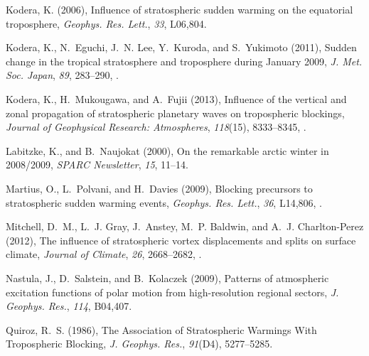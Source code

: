 \documentclass[draft,jgrga]{agutex}
\begin{document}
\begin{article}
\begin{thebibliography}{38}
Kodera, K. (2006), Influence of stratospheric sudden warming on the equatorial
  troposphere, \textit{Geophys. Res. Lett.}, \textit{33}, L06,804.

Kodera, K., N.~Eguchi, J.~N. Lee, Y.~Kuroda, and S.~Yukimoto (2011), Sudden
  change in the tropical stratosphere and troposphere during {January} 2009,
  \textit{J. Met. Soc. Japan}, \textit{89}, 283--290,
  .

Kodera, K., H.~Mukougawa, and A.~Fujii (2013), {Influence of the vertical and
  zonal propagation of stratospheric planetary waves on tropospheric
  blockings}, \textit{Journal of Geophysical Research: Atmospheres},
  \textit{118}(15), 8333--8345, .

Labitzke, K., and B.~Naujokat (2000), On the remarkable arctic winter in
  2008/2009, \textit{{SPARC} Newsletter}, \textit{15}, 11--14.

Martius, O., L.~Polvani, and H.~Davies (2009), Blocking precursors to
  stratospheric sudden warming events, \textit{Geophys. Res. Lett.},
  \textit{36}, L14,806, .

Mitchell, D.~M., L.~J. Gray, J.~Anstey, M.~P. Baldwin, and A.~J. Charlton-Perez
  (2012), The influence of stratospheric vortex displacements and splits on
  surface climate, \textit{Journal of Climate}, \textit{26}, 2668--2682,
  .

Nastula, J., D.~Salstein, and B.~Kolaczek (2009), Patterns of atmospheric
  excitation functions of polar motion from high-resolution regional sectors,
  \textit{J. Geophys. Res.}, \textit{114}, B04,407.

Quiroz, R.~S. (1986), {The Association of Stratospheric Warmings With
  Tropospheric Blocking}, \textit{J. Geophys. Res.}, \textit{91}(D4),
  5277--5285.


\end{thebibliography}
\end{article}
\end{document}
